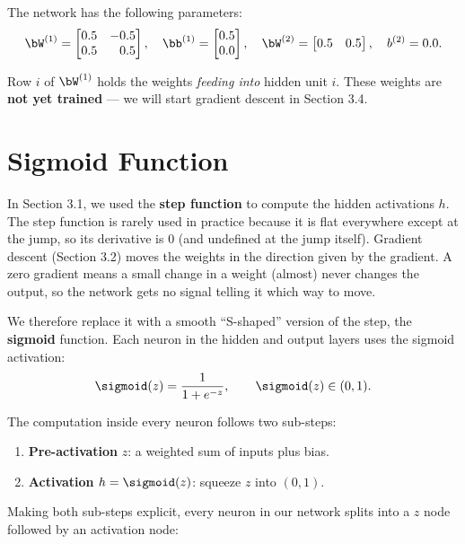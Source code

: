 \documentclass[12pt, a4paper]{article}
\begin{document}
\vspace{0.5em}

The network has the following parameters:
\[
  \bW^{(1)} = \begin{bmatrix} 0.5 & -0.5 \\ 0.5 & \phantom{-}0.5 \end{bmatrix},
  \quad
  \bb^{(1)} = \begin{bmatrix} 0.5 \\ 0.0 \end{bmatrix},
  \quad
  \bW^{(2)} = \begin{bmatrix} 0.5 & 0.5 \end{bmatrix},
  \quad
  b^{(2)} = 0.0.
\]

Row $i$ of $\bW^{(1)}$ holds the weights \emph{feeding into} hidden unit $i$.
These weights are \textbf{not yet trained} --- we will start gradient descent
in Section 3.4.

\section{Sigmoid Function}
In Section 3.1, we used the \textbf{step function} to compute the hidden
activations $h$. The step function is rarely used in practice because it is
flat everywhere except at the jump, so its derivative is $0$ (and undefined
at the jump itself).
Gradient descent (Section 3.2) moves the weights in the direction given by
the gradient. A zero gradient means a small change in a weight (almost) never changes
the output, so the network gets no signal telling it which way to move.

We therefore replace it with a smooth ``S-shaped'' version of the step,
the \textbf{sigmoid} function. Each neuron in the hidden and output layers uses
the sigmoid activation:
\[
  \sigmoid(z) = \frac{1}{1 + e^{-z}}, \qquad \sigmoid(z) \in (0, 1).
\]

The computation inside every neuron follows two sub-steps:
\begin{enumerate}[nosep]
  \item \textbf{Pre-activation} $z$: a weighted sum of inputs plus bias.
  \item \textbf{Activation} $h = \sigmoid(z)$: squeeze $z$ into $(0,1)$.
\end{enumerate}

Making both sub-steps explicit, every neuron in our network splits into a
$z$ node followed by an activation node:
\end{document}
